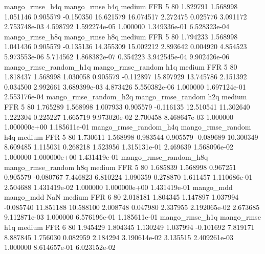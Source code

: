        mango_rmse_h4q        mango_rmse                  h4q     medium      FFR                 5 80  1.829791       1.568998 1.051146       0.905579   -0.150350     16.621579     16.074517     2.272475       0.025776  3.091172 2.753748e-03     4.598792   1.592274e-05            1.000000    1.349336e-01        6.528323e-04
       mango_rmse_h8q        mango_rmse                  h8q     medium      FFR                 5 80  1.794233       1.568998 1.041436       0.905579   -0.135136     14.355309     15.002212     2.893642       0.004920  4.854523 5.973553e-06     5.714562   1.868382e-07            0.354223    3.942545e-04        9.902426e-06
mango_rmse_random_h1q mango_rmse_random                  h1q     medium      FFR                 5 80  1.818437       1.568998 1.030058       0.905579   -0.112897     15.897929     13.745786     2.151392       0.034500  2.992661 3.689399e-03     4.873426   5.550382e-06            1.000000    1.697124e-01        2.553176e-04
mango_rmse_random_h2q mango_rmse_random                  h2q     medium      FFR                 5 80  1.765289       1.568998 1.007933       0.905579   -0.116135     12.510541     11.302640     1.222304       0.225227  1.665719 9.973020e-02     2.700458   8.468647e-03            1.000000    1.000000e+00        1.185611e-01
mango_rmse_random_h4q mango_rmse_random                  h4q     medium      FFR                 5 80  1.730611       1.568998 0.983544       0.905579   -0.089689     10.300349      8.609485     1.115031       0.268218  1.523956 1.315131e-01     2.469639   1.568096e-02            1.000000    1.000000e+00        1.431419e-01
mango_rmse_random_h8q mango_rmse_random                  h8q     medium      FFR                 5 80  1.685839       1.568998 0.967251       0.905579   -0.080767      7.446823      6.810224     1.090359       0.278870  1.611457 1.110686e-01     2.504688   1.431419e-02            1.000000    1.000000e+00        1.431419e-01
            mango_mdd         mango_mdd                  NaN     medium      FFR                 6 80  2.018181       1.804345 1.147897       1.037994   -0.085740     11.851188     10.588100     2.008748       0.047980  2.337955 2.192065e-02     2.673685   9.112871e-03            1.000000    6.576196e-01        1.185611e-01
       mango_rmse_h1q        mango_rmse                  h1q     medium      FFR                 6 80  1.945429       1.804345 1.130249       1.037994   -0.101692      7.819171      8.887845     1.756030       0.082959  2.184294 3.190614e-02     3.135515   2.409261e-03            1.000000    8.614657e-01        6.023152e-02
